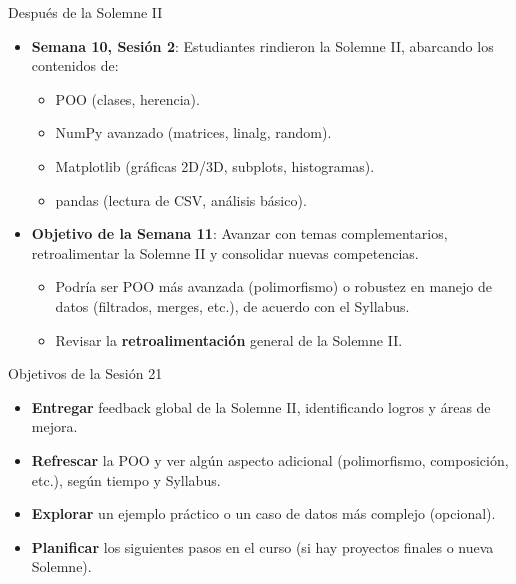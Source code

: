 \documentclass[10pt]{beamer}
\begin{document}
\begin{frame}{Después de la Solemne II}
  \begin{itemize}
    \item \textbf{Semana 10, Sesión 2}: Estudiantes rindieron la Solemne II, abarcando los contenidos de:
      \begin{itemize}
        \item POO (clases, herencia).
        \item NumPy avanzado (matrices, linalg, random).
        \item Matplotlib (gráficas 2D/3D, subplots, histogramas).
        \item pandas (lectura de CSV, análisis básico).
      \end{itemize}
    \item \textbf{Objetivo de la Semana 11}: Avanzar con temas complementarios, retroalimentar la Solemne II y consolidar nuevas competencias. 
      \begin{itemize}
        \item Podría ser POO más avanzada (polimorfismo) o robustez en manejo de datos (filtrados, merges, etc.), de acuerdo con el Syllabus.
        \item Revisar la \textbf{retroalimentación} general de la Solemne II.
      \end{itemize}
  \end{itemize}
\end{frame}

\begin{frame}{Objetivos de la Sesión 21}
  \begin{itemize}
    \item \textbf{Entregar} feedback global de la Solemne II, identificando logros y áreas de mejora.
    \item \textbf{Refrescar} la POO y ver algún aspecto adicional (polimorfismo, composición, etc.), según tiempo y Syllabus.
    \item \textbf{Explorar} un ejemplo práctico o un caso de datos más complejo (opcional).
    \item \textbf{Planificar} los siguientes pasos en el curso (si hay proyectos finales o nueva Solemne).
  \end{itemize}
\end{frame}
\end{document}
